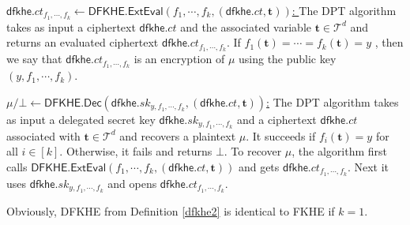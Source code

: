 \documentclass[runningheads,10pt]{llncs}
\begin{document}
\begin{definition}[DFKHE]
\begin{description}

\item \underline{$\mathsf{dfkhe}.ct_{f_1,\cdots, f_k} \leftarrow \mathsf{DFKHE.ExtEval}(f_1,\cdots, f_{k},(\mathsf{dfkhe}.ct,\mathbf{t} ))$: } 
The DPT algorithm takes as input a ciphertext $\mathsf{dfkhe}.ct$ and the associated variable $\mathbf{t} \in \mathcal{T}^d$
and returns an evaluated ciphertext $\mathsf{dfkhe}.ct_{f_1,\cdots, f_k}$. If $f_1(\mathbf{t})=\cdots=f_k(\mathbf{t})=y$ ,  then we say that $\mathsf{dfkhe}.ct_{f_1, \cdots, f_k}$ is an encryption  of $\mu$ using the public key $(y,f_1, \cdots, f_k)$.


\item \underline{$\mu/\bot \leftarrow \mathsf{DFKHE.Dec}(\mathsf{dfkhe}.sk_{y,f_1, \cdots, f_k}, (\mathsf{dfkhe}.ct,\mathbf{t}))$:}   
The DPT algorithm takes as input  a delegated secret key $\mathsf{dfkhe}.sk_{y,f_1, \cdots, f_k}$
and a ciphertext $\mathsf{dfkhe}.ct$  associated with $ \mathbf{t}\in \mathcal{T}^d$
and recovers a plaintext $\mu$. 
It succeeds if $f_i(\mathbf{t})=y$ for all $i\in[k]$. 
Otherwise, it fails and returns $\bot$. 
To recover $\mu$, the algorithm first calls $ \mathsf{DFKHE.ExtEval}(f_1,\cdots, f_{k},(\mathsf{dfkhe}.ct,\mathbf{t} ))$ 
and gets $\mathsf{dfkhe}.ct_{f_1,\cdots, f_k}$.
Next it uses $\mathsf{dfkhe}.sk_{y, f_1, \cdots, f_k}$ and opens $\mathsf{dfkhe}.ct_{f_1,\cdots, f_k}$.


\end{description}
\end{definition}
Obviously, DFKHE from Definition \ref{dfkhe2} is identical to FKHE \cite{BGG+14}  if $k=1$.\\
\end{document}
